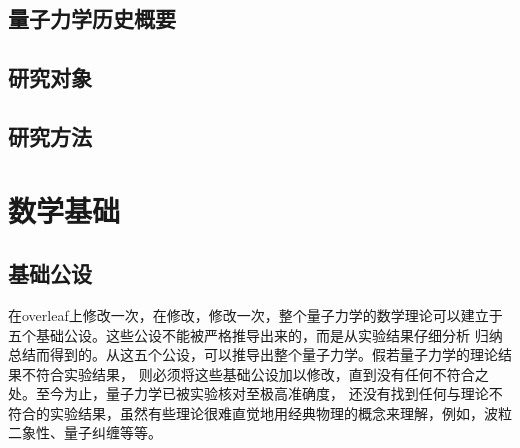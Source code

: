 \documentclass[type=doctor]{fduthesis}
\begin{document}
\section{量子力学历史概要}

\section{研究对象}

 \section{研究方法}

\chapter{数学基础}

\section{基础公设}

在overleaf上修改一次，在修改，修改一次，整个量子力学的数学理论可以建立于五个基础公设。这些公设不能被严格推导出来的，而是从实验结果仔细分析
归纳总结而得到的。从这五个公设，可以推导出整个量子力学。假若量子力学的理论结果不符合实验结果，
则必须将这些基础公设加以修改，直到没有任何不符合之处。至今为止，量子力学已被实验核对至极高准确度，
还没有找到任何与理论不符合的实验结果，虽然有些理论很难直觉地用经典物理的概念来理解，例如，波粒
二象性、量子纠缠等等\cite{zurek2014quantum,cohen2013claude,zettili2003quantum}。
\end{document}
